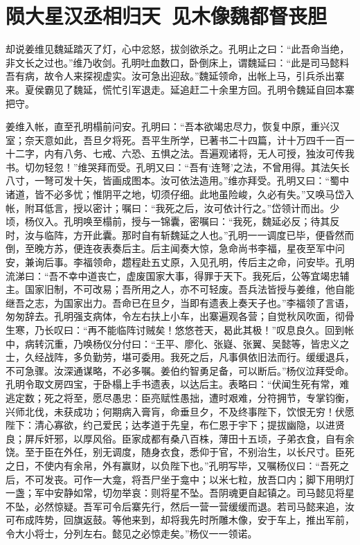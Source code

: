 \chapter{陨大星汉丞相归天~见木像魏都督丧胆}

却说姜维见魏延踏灭了灯，心中忿怒，拔剑欲杀之。孔明止之曰：“此吾命当绝，非文长之过也。”维乃收剑。孔明吐血数口，卧倒床上，谓魏延曰：“此是司马懿料吾有病，故令人来探视虚实。汝可急出迎敌。”魏延领命，出帐上马，引兵杀出寨来。夏侯霸见了魏延，慌忙引军退走。延追赶二十余里方回。孔明令魏延自回本寨把守。

姜维入帐，直至孔明榻前问安。孔明曰：“吾本欲竭忠尽力，恢复中原，重兴汉室；奈天意如此，吾旦夕将死。吾平生所学，已著书二十四篇，计十万四千一百一十二字，内有八务、七戒、六恐、五惧之法。吾遍观诸将，无人可授，独汝可传我书。切勿轻忽！”维哭拜而受。孔明又曰：“吾有‘连弩’之法，不曾用得。其法矢长八寸，一弩可发十矢，皆画成图本。汝可依法造用。”维亦拜受。孔明又曰：“蜀中诸道，皆不必多忧；惟阴平之地，切须仔细。此地虽险峻，久必有失。”又唤马岱入帐，附耳低言，授以密计；嘱曰：“我死之后，汝可依计行之。”岱领计而出。少顷，杨仪入。孔明唤至榻前，授与一锦囊，密嘱曰：“我死，魏延必反；待其反时，汝与临阵，方开此囊。那时自有斩魏延之人也。”孔明一一调度已毕，便昏然而倒，至晚方苏，便连夜表奏后主。后主闻奏大惊，急命尚书李福，星夜至军中问安，兼询后事。李福领命，趱程赴五丈原，入见孔明，传后主之命，问安毕。孔明流涕曰：“吾不幸中道丧亡，虚废国家大事，得罪于天下。我死后，公等宜竭忠辅主。国家旧制，不可改易；吾所用之人，亦不可轻废。吾兵法皆授与姜维，他自能继吾之志，为国家出力。吾命已在旦夕，当即有遗表上奏天子也。”李福领了言语，匆匆辞去。孔明强支病体，令左右扶上小车，出寨遍观各营；自觉秋风吹面，彻骨生寒，乃长叹曰：“再不能临阵讨贼矣！悠悠苍天，曷此其极！”叹息良久。回到帐中，病转沉重，乃唤杨仪分付曰：“王平、廖化、张嶷、张翼、吴懿等，皆忠义之士，久经战阵，多负勤劳，堪可委用。我死之后，凡事俱依旧法而行。缓缓退兵，不可急骤。汝深通谋略，不必多嘱。姜伯约智勇足备，可以断后。”杨仪泣拜受命。孔明令取文房四宝，于卧榻上手书遗表，以达后主。表略曰：“伏闻生死有常，难逃定数；死之将至，愿尽愚忠：臣亮赋性愚拙，遭时艰难，分符拥节，专掌钧衡，兴师北伐，未获成功；何期病入膏肓，命垂旦夕，不及终事陛下，饮恨无穷！伏愿陛下：清心寡欲，约己爱民；达孝道于先皇，布仁恩于宇下；提拔幽隐，以进贤良；屏斥奸邪，以厚风俗。臣家成都有桑八百株，薄田十五顷，子弟衣食，自有余饶。至于臣在外任，别无调度，随身衣食，悉仰于官，不别治生，以长尺寸。臣死之日，不使内有余帛，外有赢财，以负陛下也。”孔明写毕，又嘱杨仪曰：“吾死之后，不可发丧。可作一大龛，将吾尸坐于龛中；以米七粒，放吾口内；脚下用明灯一盏；军中安静如常，切勿举哀：则将星不坠。吾阴魂更自起镇之。司马懿见将星不坠，必然惊疑。吾军可令后寨先行，然后一营一营缓缓而退。若司马懿来追，汝可布成阵势，回旗返鼓。等他来到，却将我先时所雕木像，安于车上，推出军前，令大小将士，分列左右。懿见之必惊走矣。”杨仪一一领诺。

